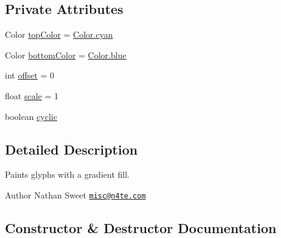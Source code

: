 \subsection*{Private Attributes}
\begin{DoxyCompactItemize}
\item 
Color \mbox{\hyperlink{classorg_1_1newdawn_1_1slick_1_1font_1_1effects_1_1_gradient_effect_abd381669fcbe81fae9c0fb7546d8089d}{top\+Color}} = \mbox{\hyperlink{classorg_1_1newdawn_1_1slick_1_1_color_ae296d247f4920ee8be313168843d4710}{Color.\+cyan}}
\item 
Color \mbox{\hyperlink{classorg_1_1newdawn_1_1slick_1_1font_1_1effects_1_1_gradient_effect_afc1661928816b8210b1fe9d6f43c74c8}{bottom\+Color}} = \mbox{\hyperlink{classorg_1_1newdawn_1_1slick_1_1_color_af55c4f4e0af464d15cf85939058f4567}{Color.\+blue}}
\item 
int \mbox{\hyperlink{classorg_1_1newdawn_1_1slick_1_1font_1_1effects_1_1_gradient_effect_ab518db3e9fe880bf83ce8b37ee361825}{offset}} = 0
\item 
float \mbox{\hyperlink{classorg_1_1newdawn_1_1slick_1_1font_1_1effects_1_1_gradient_effect_aa2b56ea1a52119215a041ac8328abcec}{scale}} = 1
\item 
boolean \mbox{\hyperlink{classorg_1_1newdawn_1_1slick_1_1font_1_1effects_1_1_gradient_effect_acbd7560addc0833e17851d5008dfbf18}{cyclic}}
\end{DoxyCompactItemize}


\subsection{Detailed Description}
Paints glyphs with a gradient fill.

\begin{DoxyAuthor}{Author}
Nathan Sweet \href{mailto:misc@n4te.com}{\tt misc@n4te.\+com} 
\end{DoxyAuthor}


\subsection{Constructor \& Destructor Documentation}
\mbox{\label{classorg_1_1newdawn_1_1slick_1_1font_1_1effects_1_1_gradient_effect_a1437721eb073f6f3e7ef6d17bab867dd}} 
